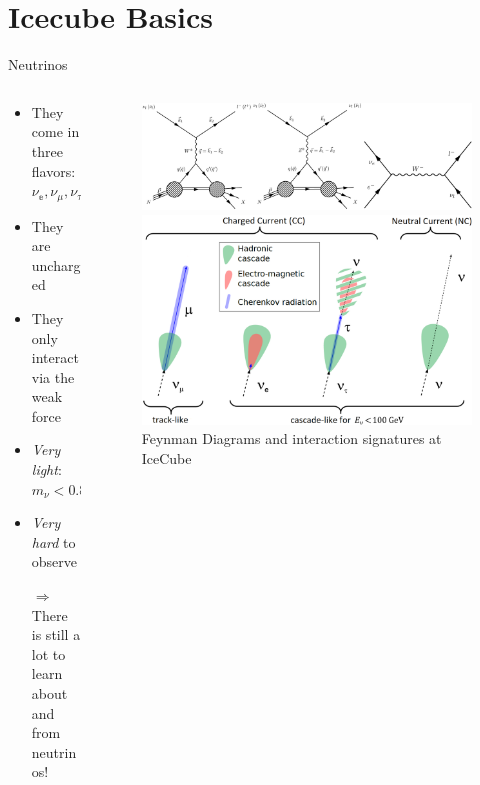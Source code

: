 \section{Icecube Basics}

%

\begin{frame}{Neutrinos}
    \begin{columns}
        \begin{column}{0.4\textwidth}
            \begin{itemize}
                \item They come in three flavors: $\nu_{\mathbb{e}}, \nu_{\mathbb{\mu}}, \nu_{\mathbb{\tau}}$
                \item They are uncharged
                \item They only interact via the weak force
                \item \emph{Very light}: $m_{\nu} < \SI{0.8}{\electronvolt}$\footnotemark[1]
                \item \emph{Very hard} to observe
                \item[$\Rightarrow$] There is still a lot to learn about and from neutrinos!
            \end{itemize}
        \end{column}
        \begin{column}{0.6\textwidth}
            \begin{figure}
                \centering
                \includegraphics[width=.7\textwidth]{media/feynman_diagrams.png}

                \includegraphics[width=.6\textwidth]{media/neutrino_interaction.png}
                \caption*{Feynman Diagrams and interaction signatures at IceCube \footnotemark[2]}
            \end{figure}
        \end{column}
    \end{columns}
\end{frame}
